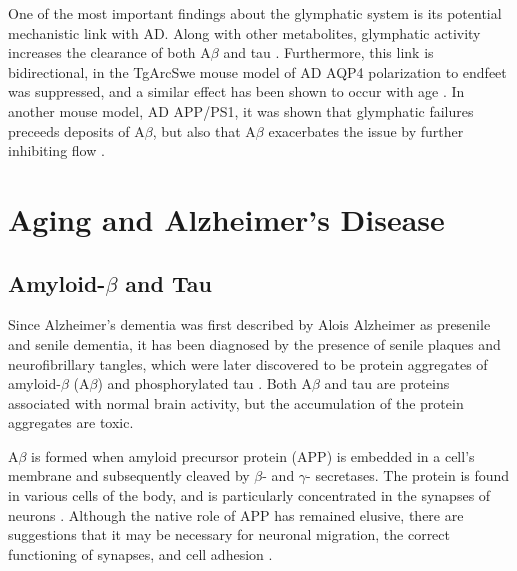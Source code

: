 One of the most important findings about the glymphatic system is its potential mechanistic link with AD. Along with other metabolites, glymphatic activity increases the clearance of both A$\beta$ and tau \citep{Iliff2012, Iliff2014, Xie}. Furthermore, this link is bidirectional, in the TgArcSwe mouse model of AD AQP4 polarization to endfeet was suppressed, and a similar effect has been shown to occur with age \citep{Yang2013, Kress2014, Zeppenfeld2017}. In another mouse model, AD APP/PS1, it was shown that glymphatic failures preceeds deposits of A$\beta$, but also that A$\beta$ exacerbates the issue by further inhibiting flow \citep{Peng2016}.


\section*{Aging and Alzheimer's Disease}
\subsection*{Amyloid-$\beta$ and Tau}
Since Alzheimer's dementia was first described by Alois Alzheimer as presenile and senile dementia, it has been diagnosed by the presence of senile plaques and neurofibrillary tangles, which were later discovered to be protein aggregates of amyloid-$\beta$ (A$\beta$) and phosphorylated tau \citep{Berrios1990}. Both A$\beta$ and tau are proteins associated with normal brain activity, but the accumulation of the protein aggregates are toxic.

A$\beta$ is formed when amyloid precursor protein (APP) is embedded in a cell's membrane and subsequently cleaved by $\beta$- and $\gamma$- secretases\citep{Vassar1999}. The protein is found in various cells of the body, and is particularly concentrated in the synapses of neurons \citep{Priller2006a}. Although the native role of APP has remained elusive, there are suggestions that it may be necessary for neuronal migration, the correct functioning of synapses, and cell adhesion \citep{Mattson1997,Young-Pearse2007,Priller2006a}. 

